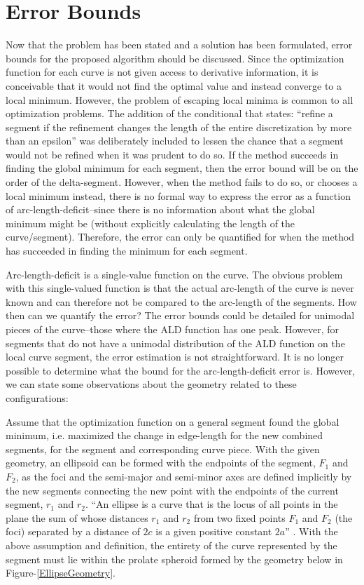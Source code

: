 \section{Error Bounds}
Now that the problem has been stated and a solution has been formulated, error bounds for the proposed algorithm should be discussed.  Since the optimization function for each curve is not given access to derivative information, it is conceivable that it would not find the optimal value and instead converge to a local minimum.  However, the problem of escaping local minima is common to all optimization problems.  The addition of the conditional that states: ``refine a segment if the refinement changes the length of the entire discretization by more than an epsilon'' was deliberately included to lessen the chance that a segment would not be refined when it was prudent to do so.  If the method succeeds in finding the global minimum for each segment, then the error bound will be on the order of the delta-segment.  However, when the method fails to do so, or chooses a local minimum instead, there is no formal way to express the error as a function of arc-length-deficit--since there is no information about what the global minimum might be (without explicitly calculating the length of the curve/segment).  Therefore, the error can only be quantified for when the method has succeeded in finding the minimum for each segment.

        Arc-length-deficit is a single-value function on the curve.  The obvious problem with this single-valued function is that the actual arc-length of the curve is never known and can therefore not be compared to the arc-length of the segments.  How then can we quantify the error?  The error bounds could be detailed for unimodal pieces of the curve--those where the ALD function has one peak. However, for segments that do not have a unimodal distribution of the ALD function on the local curve segment, the error estimation is not straightforward.  It is no longer possible to determine what the bound for the arc-length-deficit error is.  However, we can state some observations about the geometry related to these configurations:

Assume that the optimization function on a general segment found the global minimum, i.e. maximized the change in edge-length for the new combined segments, for the segment and corresponding curve piece.  With the given geometry, an ellipsoid can be formed with the endpoints of the segment, $F_1$ and $F_2$, as the foci and the semi-major and semi-minor axes are defined implicitly by the new segments connecting the new point with the endpoints of the current segment, $r_1$ and $r_2$.  ``An ellipse is a curve that is the locus of all points in the plane the sum of whose distances $r_1$ and $r_2$ from two fixed points $F_1$ and $F_2$ (the foci) separated by a distance of $2c$ is a given positive constant $2a$'' \cite{weissteine}.  With the above assumption and definition, the entirety of the curve represented by the segment must lie within the prolate spheroid  formed by the geometry below in Figure-\ref{EllipseGeometry}.

